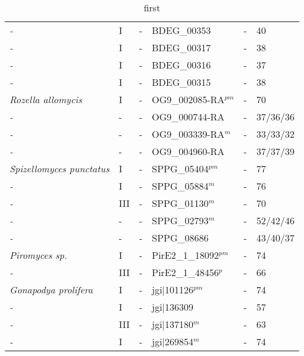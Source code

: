 \begin{table}[tbp]
\begin{tabular}{llllll}
  \emph{-} & I & - & BDEG\_00353 & - & 40 \\ 
  \emph{-} & I & - & BDEG\_00317 & - & 38 \\ 
  \emph{-} & I & - & BDEG\_00316 & - & 37 \\ 
  \emph{-} & I & - & BDEG\_00315 & - & 38 \\ 
  \emph{Rozella allomycis } & I & - & OG9\_002085-RA$^{pm}$ & - & 70 \\ 
  \emph{-} & - & - & OG9\_000744-RA & - & 37/36/36 \\ 
  \emph{-} & - & - & OG9\_003339-RA$^{m}$ & - & 33/33/32 \\ 
  \emph{-} & - & - & OG9\_004960-RA & - & 37/37/39 \\ 
  \emph{Spizellomyces punctatus } & I & - & SPPG\_05404$^{pm}$ & - & 77 \\ 
  \emph{-} & I & - & SPPG\_05884$^{m}$ & - & 76 \\ 
  \emph{-} & III & - & SPPG\_01130$^{m}$ & - & 70 \\ 
  \emph{-} & - & - & SPPG\_02793$^{m}$ & - & 52/42/46 \\ 
  \emph{-} & - & - & SPPG\_08686 & - & 43/40/37 \\ 
  \emph{Piromyces sp. } & I & - & PirE2\_1\_18092$^{pm}$ & - & 74 \\ 
  \emph{-} & III & - & PirE2\_1\_48456$^{p}$ & - & 66 \\ 
  \emph{Gonapodya prolifera } & I & - & jgi|101126$^{pm}$ & - & 74 \\ 
  \emph{-} & I & - & jgi|136309 & - & 57 \\ 
  \emph{-} & III & - & jgi|137180$^{m}$ & - & 63 \\ 
  \emph{-} & I & - & jgi|269854$^{m}$ & - & 74 \\ 
   \hline
\end{tabular}
\caption[G$\alpha$ subunit comparison]{first} 
\label{tab:ChRhodA_Gcomp}
\end{table}
